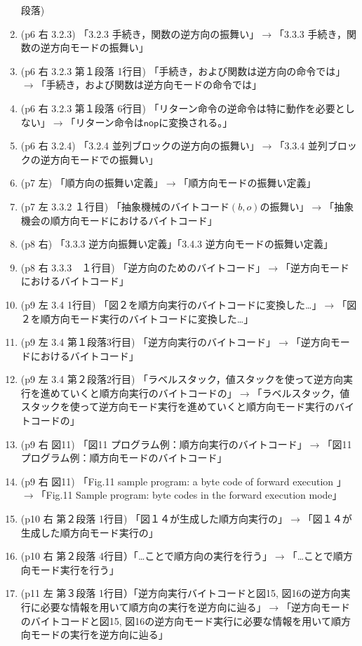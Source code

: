 \documentclass[a4j]{jarticle}
\begin{document}
\begin{enumerate}
段落)   
\item (p6 右 3.2.3) 「3.2.3 手続き，関数の逆方向の振舞い」$\rightarrow$「3.3.3 手続き，関数の逆方向モードの振舞い」
\item (p6 右 3.2.3 第１段落 1行目) 「手続き，および関数は逆方向の命令では」$\rightarrow$「手続き，および関数は逆方向モードの命令では」
\item (p6 右 3.2.3 第１段落 6行目) 「リターン命令の逆命令は特に動作を必要としない」$\rightarrow$「リターン命令は$\mathsf{nop}$に変換される。」
\item (p6 右 3.2.4) 「3.2.4 並列ブロックの逆方向の振舞い」$\rightarrow$「3.3.4 並列ブロックの逆方向モードでの振舞い」
\item (p7 左) 「順方向の振舞い定義」$\rightarrow$「順方向モードの振舞い定義」
\item (p7 左 3.3.2 １行目)  「抽象機械のバイトコード$(b,o)$の振舞い」$\rightarrow$「抽象機会の順方向モードにおけるバイトコード」
\item (p8 右) 「3.3.3 逆方向振舞い定義」「3.4.3 逆方向モードの振舞い定義」
\item (p8 右 3.3.3　１行目) 「逆方向のためのバイトコード」$\rightarrow$「逆方向モードにおけるバイトコード」
\item (p9 左 3.4 1行目) 「図２を順方向実行のバイトコードに変換した…」$\rightarrow$「図２を順方向モード実行のバイトコードに変換した…」
\item (p9 左 3.4 第１段落3行目) 「逆方向実行のバイトコード」$\rightarrow$「逆方向モードにおけるバイトコード」
\item (p9 左 3.4 第２段落2行目) 「ラベルスタック，値スタックを使って逆方向実行を進めていくと順方向実行のバイトコードの」$\rightarrow$「ラベルスタック，値スタックを使って逆方向モード実行を進めていくと順方向モード実行のバイトコードの」
\item (p9 右 図11) 「図11 プログラム例：順方向実行のバイトコード」$\rightarrow$「図11 プログラム例：順方向モードのバイトコード」
\item (p9 右 図11)  「Fig.11 sample program: a byte code of forward execution 」$\rightarrow$「Fig.11 Sample program: byte codes in the forward execution mode」
\item (p10 右 第２段落 1行目) 「図１４が生成した順方向実行の」$\rightarrow$「図１４が生成した順方向モード実行の」
\item (p10 右 第２段落 4行目）「…ことで順方向の実行を行う」$\rightarrow$「…ことで順方向モード実行を行う」
\item (p11 左 第３段落 1行目）「逆方向実行バイトコードと図15, 図16の逆方向実行に必要な情報を用いて順方向の実行を逆方向に辿る」$\rightarrow$「逆方向モードのバイトコードと図15, 図16の逆方向モード実行に必要な情報を用いて順方向モードの実行を逆方向に辿る」

\end{enumerate}
\end{document}
